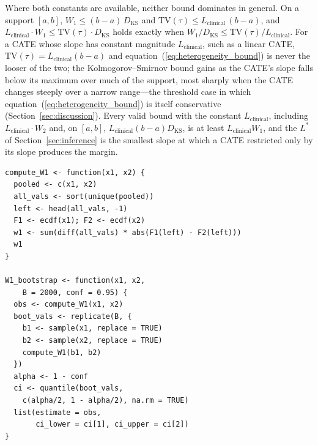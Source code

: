 \documentclass[AMA,Times1COL]{WileyNJDv5}
\begin{document}

Where both constants are available, neither bound dominates in general. On a support $[a, b]$, $W_1 \leq (b - a)\,D_{\text{KS}}$ and $\mathrm{TV}(\tau) \leq L_{\text{clinical}}\,(b - a)$, and $L_{\text{clinical}} \cdot W_1 \leq \mathrm{TV}(\tau) \cdot D_{\text{KS}}$ holds exactly when $W_1 / D_{\text{KS}} \leq \mathrm{TV}(\tau) / L_{\text{clinical}}$. For a CATE whose slope has constant magnitude $L_{\text{clinical}}$, such as a linear CATE, $\mathrm{TV}(\tau) = L_{\text{clinical}}(b - a)$ and equation~(\ref{eq:heterogeneity_bound}) is never the looser of the two; the Kolmogorov--Smirnov bound gains as the CATE's slope falls below its maximum over much of the support, most sharply when the CATE changes steeply over a narrow range---the threshold case in which equation~(\ref{eq:heterogeneity_bound}) is itself conservative (Section~\ref{sec:discussion}). Every valid bound with the constant $L_{\text{clinical}}$, including $L_{\text{clinical}} \cdot W_2$ and, on $[a, b]$, $L_{\text{clinical}} (b - a) D_{\text{KS}}$, is at least $L_{\text{clinical}} W_1$, and the $L^*$ of Section~\ref{sec:inference} is the smallest slope at which a CATE restricted only by its slope produces the margin.


\begin{lstlisting}[caption={R function for computing the Wasserstein-1 distance with bootstrap confidence intervals.},label=lst:nabcd,basicstyle=\fontsize{8}{10}\selectfont\ttfamily]
compute_W1 <- function(x1, x2) {
  pooled <- c(x1, x2)
  all_vals <- sort(unique(pooled))
  left <- head(all_vals, -1)
  F1 <- ecdf(x1); F2 <- ecdf(x2)
  w1 <- sum(diff(all_vals) * abs(F1(left) - F2(left)))
  w1
}

W1_bootstrap <- function(x1, x2,
    B = 2000, conf = 0.95) {
  obs <- compute_W1(x1, x2)
  boot_vals <- replicate(B, {
    b1 <- sample(x1, replace = TRUE)
    b2 <- sample(x2, replace = TRUE)
    compute_W1(b1, b2)
  })
  alpha <- 1 - conf
  ci <- quantile(boot_vals,
    c(alpha/2, 1 - alpha/2), na.rm = TRUE)
  list(estimate = obs,
       ci_lower = ci[1], ci_upper = ci[2])
}
\end{lstlisting}
\end{document}

